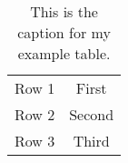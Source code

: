 \documentclass{article}
\newcommand{\templabel}{}%
\newcommand{\tempcaption}{}%
\newenvironment{mytable}[3]
{
  \gdef\templabel{#1}
  \gdef\tempcaption{#2}
  \begin{table}[hbtp]
    \centering
      \begin{tabular}{#3}
}
{
      \end{tabular}
      \caption{\tempcaption}
      \label{\templabel}
  \end{table}
}
\begin{document}
\begin{mytable}{tab:example}{This is the caption for my example table.}{cc}
  Row 1 & First \\
  Row 2 & Second \\
  Row 3 & Third \\
\end{mytable}
\end{document}
